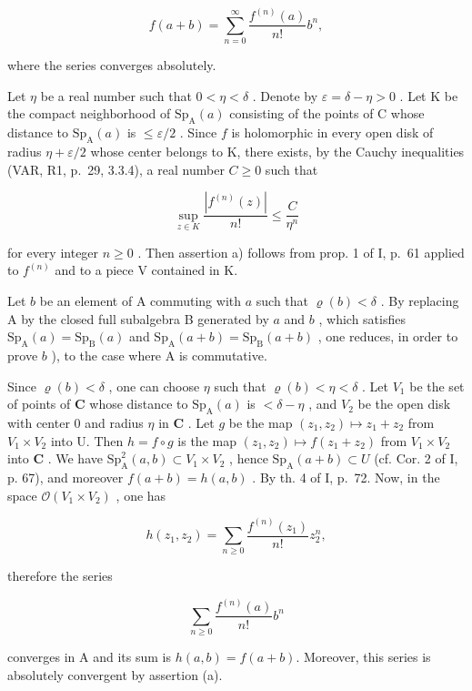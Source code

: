 \[
f (a + b) = \sum_ {n = 0} ^ {\infty} \frac {f ^ {(n)} (a)}{n !} b ^ {n},
\]

where the series converges absolutely.

Let \(\eta\) be a real number such that \(0 < \eta < \delta\) . Denote by \(\varepsilon = \delta - \eta > 0\) . Let K be the compact neighborhood of \(\mathrm{Sp}_{\mathrm{A}}(a)\) consisting of the points of C whose distance to \(\mathrm{Sp}_{\mathrm{A}}(a)\) is \(\leqslant \varepsilon / 2\) . Since \(f\) is holomorphic in every open disk of radius \(\eta + \varepsilon / 2\) whose center belongs to K, there exists, by the Cauchy inequalities (VAR, R1, p.~29, 3.3.4), a real number \(C \geqslant 0\) such that

\[
\sup _ {z \in K} \frac {| f ^ {(n)} (z) |}{n !} \leqslant \frac {C}{\eta^ {n}}
\]

for every integer \(n \geqslant 0\) . Then assertion a) follows from prop. 1 of I, p.~61 applied to \(f^{(n)}\) and to a piece V contained in K.

Let \(b\) be an element of A commuting with \(a\) such that \(\varrho(b) < \delta\) . By replacing A by the closed full subalgebra B generated by \(a\) and \(b\) , which satisfies \(\mathrm{Sp}_{\mathrm{A}}(a) = \mathrm{Sp}_{\mathrm{B}}(a)\) and \(\mathrm{Sp}_{\mathrm{A}}(a + b) = \mathrm{Sp}_{\mathrm{B}}(a + b)\) , one reduces, in order to prove \(b\) ), to the case where A is commutative.

Since \(\varrho(b) < \delta\) , one can choose \(\eta\) such that \(\varrho(b) < \eta < \delta\) . Let \(V_1\) be the set of points of \(\mathbf{C}\) whose distance to \(\mathrm{Sp}_{\mathrm{A}}(a)\) is \(< \delta - \eta\) , and \(V_2\) be the open disk with center 0 and radius \(\eta\) in \(\mathbf{C}\) . Let \(g\) be the map \((z_1, z_2) \mapsto z_1 + z_2\) from \(V_1 \times V_2\) into U. Then \(h = f \circ g\) is the map \((z_1, z_2) \mapsto f(z_1 + z_2)\) from \(V_1 \times V_2\) into \(\mathbf{C}\) . We have \(\mathrm{Sp}_{\mathrm{A}}^{2}(a, b) \subset V_1 \times V_2\) , hence \(\mathrm{Sp}_{\mathrm{A}}(a + b) \subset U\) (cf. Cor. 2 of I, p. 67), and moreover \(f(a + b) = h(a, b)\) . By th. 4 of I, p.~72. Now, in the space \(\mathcal{O}(V_1 \times V_2)\) , one has

\[
h (z _ {1}, z _ {2}) = \sum_ {n \geqslant 0} \frac {f ^ {(n)} (z _ {1})}{n !} z _ {2} ^ {n},
\]

therefore the series

\[
\sum_ {n \geqslant 0} \frac {f ^ {(n)} (a)}{n !} b ^ {n}
\]

converges in A and its sum is \(h(a,b)=f(a+b)\). Moreover, this series is absolutely convergent by assertion (a).

